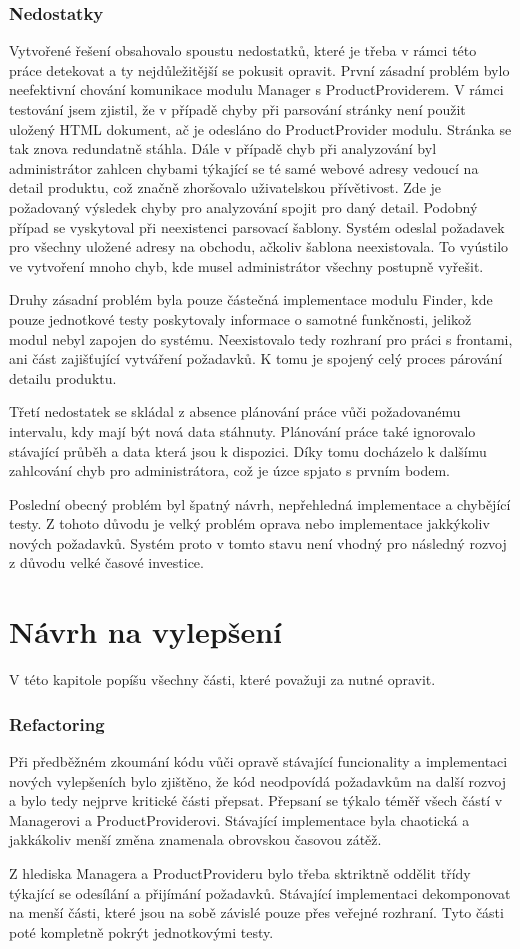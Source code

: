 \documentclass[thesis=B,czech]{FITthesis}[2012/06/26]
\begin{document}
\subsection{Nedostatky}
Vytvořené řešení obsahovalo spoustu nedostatků, které je třeba v rámci této práce detekovat a ty nejdůležitější se pokusit opravit.
První zásadní problém bylo neefektivní chování komunikace modulu Manager s ProductProviderem. V rámci testování jsem zjistil, že v 
případě chyby při parsování stránky není použit uložený HTML dokument, ač je odesláno do ProductProvider modulu.
Stránka se tak znova redundatně stáhla.
Dále v případě chyb při analyzování byl administrátor zahlcen chybami týkající se té samé webové adresy vedoucí
na detail produktu, což značně zhoršovalo uživatelskou
přívětivost. Zde je požadovaný výsledek chyby pro analyzování spojit pro daný detail.
Podobný případ se vyskytoval při neexistenci 
parsovací šablony. Systém odeslal požadavek pro všechny uložené adresy na obchodu, ačkoliv šablona neexistovala. To vyústilo
ve vytvoření mnoho chyb, kde musel administrátor všechny postupně vyřešit.
\par
Druhy zásadní problém byla pouze částečná implementace modulu Finder, kde pouze jednotkové testy poskytovaly
informace o samotné funkčnosti, jelikož modul nebyl zapojen do systému. Neexistovalo tedy rozhraní pro práci s frontami, ani část zajišťující vytváření
požadavků. K tomu je spojený celý proces párování detailu produktu.
\par
Třetí nedostatek se skládal z absence plánování práce vůči požadovanému intervalu, kdy mají být nová data
stáhnuty. Plánování práce také ignorovalo stávající průběh a data která jsou k dispozici. Díky tomu
docházelo k dalšímu zahlcování chyb pro administrátora, což je úzce spjato s prvním bodem.
\par
Poslední obecný problém byl špatný návrh, nepřehledná implementace a chybějící testy. Z tohoto důvodu
je velký problém oprava nebo implementace jakkýkoliv nových požadavků. Systém proto v tomto stavu
není vhodný pro následný rozvoj z důvodu velké časové investice.

\chapter{Návrh na vylepšení}
V této kapitole popíšu všechny části, které považuji za nutné opravit.
\subsection{Refactoring}
Při předběžném zkoumání kódu vůči opravě stávající funcionality a implementaci nových vylepšeních bylo
zjištěno, že kód neodpovídá požadavkům na další rozvoj a bylo tedy nejprve kritické části přepsat.
Přepsaní se týkalo téměř všech částí v Managerovi a ProductProviderovi. Stávající implementace byla
chaotická a jakkákoliv menší změna znamenala obrovskou časovou zátěž.
\par
Z hlediska Managera a ProductProvideru bylo třeba sktriktně oddělit třídy týkající se odesílání a přijímání požadavků.
Stávající implementaci dekomponovat na menší části, které jsou na sobě závislé pouze přes
veřejné rozhraní. Tyto části poté kompletně pokrýt jednotkovými testy.
\end{document}
